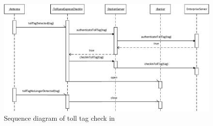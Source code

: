 \begin{figure}[H]
\includegraphics[width=1.4\columnwidth]{img/sequence_diagrams/sequence_diagram_toll_tag_check_in}
\caption{Sequence diagram of toll tag check in}
\label{fig:seq_check_in_toll_tag}
\end{figure}

